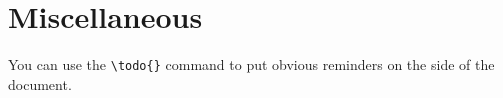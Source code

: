 \section{Miscellaneous}

You can use the \verb+\todo{}+ command to put obvious reminders on the side of the document.
